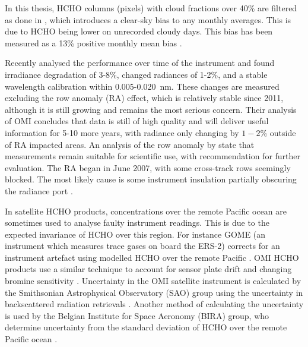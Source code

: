     
    In this thesis, HCHO columns (pixels) with cloud fractions over 40\% are filtered as done in \textcite{Palmer2001}, which introduces a clear-sky bias to any monthly averages.
    This is due to HCHO being lower on unrecorded cloudy days.
    This bias has been measured as a 13\% positive monthly mean bias \parencite{Palmer2001, Surl2018}.
    
    
    Recently \textcite{Schenkeveld2017} analysed the performance over time of the instrument and found irradiance degradation of 3-8\%, changed radiances of 1-2\%, and a stable wavelength calibration within 0.005-0.020~nm.
    These changes are measured excluding the row anomaly (RA) effect, which is relatively stable since 2011, although it is still growing and remains the most serious concern.
    Their analysis of OMI concludes that data is still of high quality and will deliver useful information for 5-10 more years, with radiance only changing by $1-2\%$ outside of RA impacted areas.
    An analysis of the row anomaly by \textcite{Huang2017} state that measurements remain suitable for scientific use, with recommendation for further evaluation.
    The RA began in June 2007, with some cross-track rows seemingly blocked. 
    The most likely cause is some instrument insulation partially obscuring the radiance port \parencite{Schenkeveld2017}.
    
    In satellite HCHO products, concentrations over the remote Pacific ocean are sometimes used to analyse faulty instrument readings.
    This is due to the expected invariance of HCHO over this region.
    For instance GOME (an instrument which measures trace gases on board the ERS-2) corrects for an instrument artefact using modelled HCHO over the remote Pacific \parencite{Shim2005}.
    OMI HCHO products use a similar technique to account for sensor plate drift and changing bromine sensitivity \parencite{Abad2015}.
    Uncertainty in the OMI satellite instrument is calculated by the Smithsonian Astrophysical Observatory (SAO) group using the uncertainty in backscattered radiation retrievals \parencite{Abad2015, Abad2016}.
    Another method of calculating the uncertainty is used by the Belgian Institute for Space Aeronomy (BIRA) group, who determine uncertainty from the standard deviation of HCHO over the remote Pacific ocean \parencite{DeSmedt2012, DeSmedt2015}.
    
